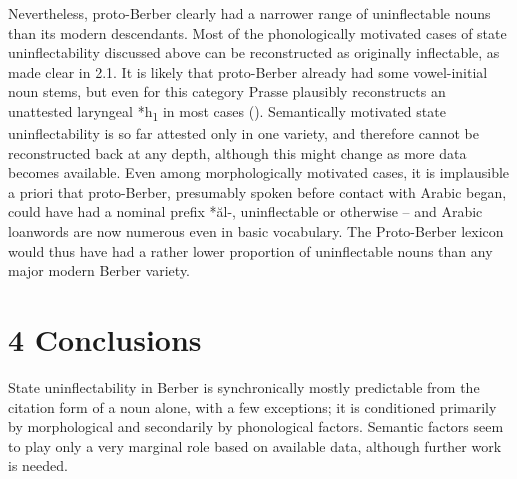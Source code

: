 \documentclass[output=paper]{langscibook}
\begin{document}
\begin{styleStandarduser}
Nevertheless, proto-Berber clearly had a narrower range of uninflectable nouns than its modern descendants. Most of the phonologically motivated cases of state uninflectability discussed above can be reconstructed as originally inflectable, as made clear in 2.1. It is likely that proto-Berber already had some vowel-initial noun stems, but even for this category Prasse plausibly reconstructs an unattested laryngeal *h\textsubscript{1} in most cases (\citealt{Prasse1969,Prasse2011}). Semantically motivated state uninflectability is so far attested only in one variety, and therefore cannot be reconstructed back at any depth, although this might change as more data becomes available. Even among morphologically motivated cases, it is implausible a priori that proto-Berber, presumably spoken before contact with Arabic began, could have had a nominal prefix *ăl-, uninflectable or otherwise – and Arabic loanwords are now numerous even in basic vocabulary. The Proto-Berber lexicon would thus have had a rather lower proportion of uninflectable nouns than any major modern Berber variety.
\end{styleStandarduser}

\section{4 Conclusions}
\begin{styleStandarduser}
State uninflectability in Berber is synchronically mostly predictable from the citation form of a noun alone, with a few exceptions; it is conditioned primarily by morphological and secondarily by phonological factors. Semantic factors seem to play only a very marginal role based on available data, although further work is needed.
\end{styleStandarduser}
\end{document}

